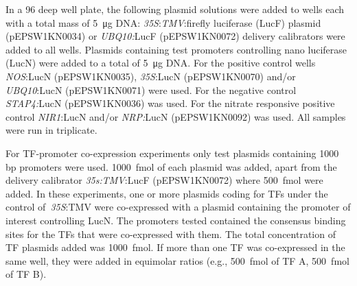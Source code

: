\documentclass[../main.tex]{subfiles}
\begin{document}

In a 96 deep well plate, the following plasmid solutions were added to
wells each with a total mass of \SI{5}{\micro\gram} DNA: \textit{35S}:\textit{TMV}:firefly
luciferase (LucF) plasmid (pEPSW1KN0034) or \textit{UBQ10:}LucF
(pEPSW1KN0072) delivery calibrators were added to all wells. Plasmids
containing test promoters controlling nano luciferase (LucN) were added to a total of \SI{5}{\micro\gram} DNA. For the positive control wells \textit{NOS}:LucN
(pEPSW1KN0035), \textit{35S}:LucN (pEPSW1KN0070) and/or \textit{UBQ10}:LucN
(pEPSW1KN0071) were used. For the negative control \textit{STAP4:}LucN
(pEPSW1KN0036) was used. For the nitrate responsive positive
control \textit{NIR1}:LucN and/or \textit{NRP:}LucN (pEPSW1KN0092) was used. All samples were run in triplicate.

For TF\hyp{}promoter co\hyp{}expression experiments only test plasmids containing 1000 bp promoters were used.
\SI{1000}{\fmol} of each plasmid was added, apart from the delivery calibrator \textit{35s:TMV}:LucF (pEPSW1KN0072) where \SI{500}{\fmol} were added.
In these experiments, one or more plasmids coding for TFs under the control of~\textit{35S}:TMV were co\hyp{}expressed with a plasmid containing the promoter of interest controlling LucN.
The promoters tested contained the consensus binding sites for the TFs that were co\hyp{}expressed with them.
The total concentration of TF plasmids added was \SI{1000}{\fmol}. If more than one TF was co-expressed in the same well, they were added in equimolar ratios (e.g., \SI{500}{\fmol} of TF A, \SI{500}{\fmol} of TF B).
\end{document}
